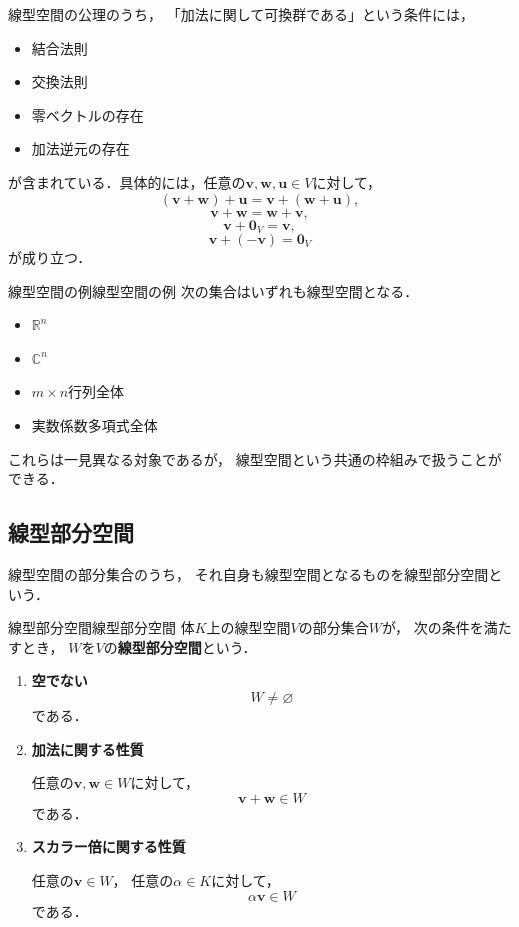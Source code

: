 \begin{mycolumn}
線型空間の公理のうち，
「加法に関して可換群である」という条件には，

\begin{itemize}
\item 結合法則
\item 交換法則
\item 零ベクトルの存在
\item 加法逆元の存在
\end{itemize}

が含まれている．具体的には，任意の$\bm{v},\bm{w},\bm{u}\in V$に対して，
\[
(\bm{v}+\bm{w})+\bm{u}=\bm{v}+(\bm{w}+\bm{u}),
\]
\[
\bm{v}+\bm{w}=\bm{w}+\bm{v},
\]
\[
\bm{v}+\bm{0}_V=\bm{v},
\]
\[
\bm{v}+(-\bm{v})=\bm{0}_V
\]
が成り立つ．
\end{mycolumn}

\begin{example}{線型空間の例}{線型空間の例}
次の集合はいずれも線型空間となる．

\begin{itemize}
\item $\mathbb{R}^n$
\item $\mathbb{C}^n$
\item $m\times n$行列全体
\item 実数係数多項式全体
\end{itemize}

これらは一見異なる対象であるが，
線型空間という共通の枠組みで扱うことができる．
\end{example}

\subsection{線型部分空間}

線型空間の部分集合のうち，
それ自身も線型空間となるものを線型部分空間という．

\begin{definition}{線型部分空間}{線型部分空間}
  体$K$上の線型空間$V$の部分集合$W$が，
  次の条件を満たすとき，
  $W$を$V$の\textbf{線型部分空間}という．
\begin{enumerate}[label=(\roman*),leftmargin=3.2em]
    \item \textbf{空でない}
    \[
      W\neq\varnothing
    \]
    である．

    \item \textbf{加法に関する性質}

    任意の$\bm{v},\bm{w}\in W$に対して，
    \[
      \bm{v}+\bm{w}\in W
    \]
    である．

    \item \textbf{スカラー倍に関する性質}

    任意の$\bm{v}\in W$，
    任意の$\alpha\in K$に対して，
    \[
      \alpha \bm{v}\in W
    \]
    である．
  \end{enumerate}
\end{definition}

